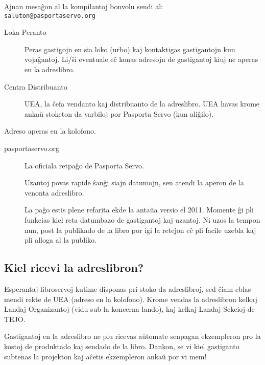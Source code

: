 {\begin{description}
Ajnan mesaĝon al la kompilantoj bonvolu sendi al:\\
\texttt{saluton@pasportaservo.org}
\end{description}

\begin{description}
\item[Loka Peranto]
Peras gastigojn en sia loko (urbo) kaj kontaktigas gastigantojn kun
vojaĝantoj. Li/ŝi eventuale eĉ konas adresojn de gastigantoj kiuj ne
aperas en la adreslibro.
\item[Centra Distribuanto]
UEA, la ĉefa vendanto kaj distribuanto de la adreslibro. UEA havas krome
ankaŭ stoketon da varbiloj por Pasporta Servo (kun aliĝilo).
\end{description}

Adreso aperas en la kolofono.

\begin{description}
\item[pasportaservo.org]
La oficiala retpaĝo de Pasporta Servo.

Uzantoj povas rapide ŝanĝi siajn datumojn, sen atendi la aperon de la
venonta adreslibro.

La paĝo estis plene refarita ekde la antaŭa versio el 2011. Momente ĝi
pli funkcias kiel reta datumbazo de gastigantoj kaj uzantoj. Ni uzos la
tempon nun, post la publikado de la libro por igi la retejon eĉ pli
facile uzebla kaj pli alloga al la publiko.
\end{description}

\subsection{Kiel ricevi la adreslibron?}

Esperantaj libroservoj kutime disponas pri stoko da adreslibroj, sed
ĉiam eblas mendi rekte de UEA (adreso en la kolofono). Krome vendas la
adreslibron kelkaj Landaj Organizantoj (vidu sub la koncerna lando), kaj
kelkaj Landaj Sekcioj de TEJO.

Gastigantoj en la adreslibro ne plu ricevas aŭtomate senpagan
ekzempleron pro la kostoj de produktado kaj sendado de la libro. Dankon,
se vi kiel gastiganto subtenas la projekton kaj aĉetis ekzempleron ankaŭ
por vi mem!
}
